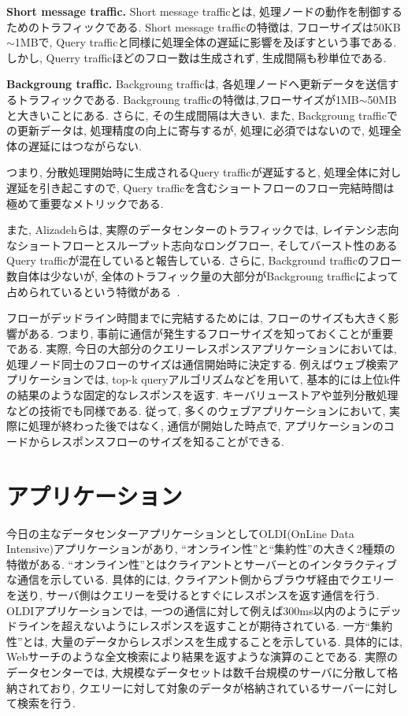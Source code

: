 {\bf Short message traffic. } Short message trafficとは,
処理ノードの動作を制御するためのトラフィックである.
Short message trafficの特徴は, フローサイズは50KB$\sim$1MBで, Query
trafficと同様に処理全体の遅延に影響を及ぼすという事である.
しかし, Querry trafficほどのフロー数は生成されず, 生成間隔も秒単位である.

{\bf Backgroung traffic. }Backgroung trafficは,
各処理ノードへ更新データを送信するトラフィックである.
Backgroung trafficの特徴は,フローサイズが1MB$\sim$50MBと大きいことにある.
さらに, その生成間隔は大きい.
また, Backgroung trafficでの更新データは, 処理精度の向上に寄与するが, 処理に必須ではないので,
処理全体の遅延にはつながらない.

つまり, 分散処理開始時に生成されるQuery trafficが遅延すると,
処理全体に対し遅延を引き起こすので, Query trafficを含むショートフローのフロー完結時間は極めて重要なメトリックである.

また, Alizadehらは, 実際のデータセンターのトラフィックでは, レイテンシ志向なショートフローとスループット志向なロングフロー,
そしてバースト性のあるQuery trafficが混在していると報告している.
さらに, Background trafficのフロー数自体は少ないが,
全体のトラフィック量の大部分がBackgroung trafficによって占められているという特徴がある~\cite{traffic}.

フローがデッドライン時間までに完結するためには, フローのサイズも大きく影響がある. 
つまり, 事前に通信が発生するフローサイズを知っておくことが重要である. 
実際, 今日の大部分のクエリーレスポンスアプリケーションにおいては, 処理ノード同士のフローのサイズは通信開始時に決定する. 
例えばウェブ検索アプリケーションでは, top-k queryアルゴリズムなどを用いて, 基本的には上位k件の結果のような固定的なレスポンスを返す. 
キーバリューストア\cite{key-value1, key-value2}や並列分散処理\cite{mapreduce,
dryad}などの技術でも同様である.  
従って, 多くのウェブアプリケーションにおいて, 実際に処理が終わった後ではなく, 通信が開始した時点で, 
アプリケーションのコードからレスポンスフローのサイズを知ることができる.


\section{アプリケーション}
今日の主なデータセンターアプリケーションとしてOLDI(OnLine Data Intensive)アプリケーションがあり,
``オンライン性''と``集約性''の大きく2種類の特徴がある\cite{oldi}.
``オンライン性''とはクライアントとサーバーとのインタラクティブな通信を示している. 
具体的には, クライアント側からブラウザ経由でクエリーを送り, サーバ側はクエリーを受けるとすぐにレスポンスを返す通信を行う. 
OLDIアプリケーションでは, 一つの通信に対して例えば300ms以内のようにデッドラインを超えないようにレスポンスを返すことが期待されている. 
一方``集約性''とは, 大量のデータからレスポンスを生成することを示している. 
具体的には, Webサーチのような全文検索により結果を返すような演算のことである. 
実際のデータセンターでは, 大規模なデータセットは数千台規模のサーバに分散して格納されており,
クエリーに対して対象のデータが格納されているサーバーに対して検索を行う. 


